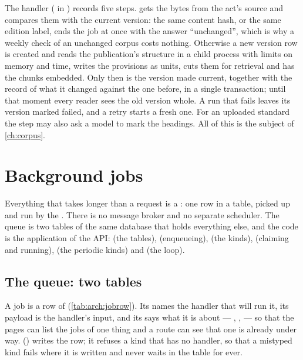 The handler ( in ) records five steps. 
gets the bytes from the act's source and compares them with the current version: the same
content hash, or the same edition label, ends the job at once with the answer
\enquote{unchanged}, which is why a weekly check of an unchanged corpus costs nothing.
Otherwise a new version row is created and  reads the publication's structure
in a child process with limits on memory and time,  writes the provisions as
units,  cuts them for retrieval and  has the chunks embedded. Only
then is the version made current, together with the record of what it changed against the
one before, in a single transaction; until that moment every reader sees the old version
whole. A run that fails leaves its version marked failed, and a retry starts a fresh one.
For an uploaded standard the  step may also ask a model to mark the headings.
All of this is the subject of \cref{ch:corpus}.

\section{Background jobs}\label{sec:arch:jobs}

Everything that takes longer than a request is a : one row in a table, picked up
and run by the . There is no message broker and no separate scheduler. The
queue is two tables of the same database that holds everything else, and the code is the
application  of the API:  (the tables), 
(enqueueing),  (the kinds),  (claiming and
running),  (the periodic kinds) and
 (the loop).

\subsection{The queue: two tables}

A job is a row of  (\cref{tab:arch:jobrow}). Its  names the handler
that will run it, its payload is the handler's input, and its  says what it is
about --- , ,  --- so that the pages
can list the jobs of one thing and a route can see that one is already under way.
 () writes the row; it refuses a kind that has no handler,
so that a mistyped kind fails where it is written and never waits in the table for ever.

